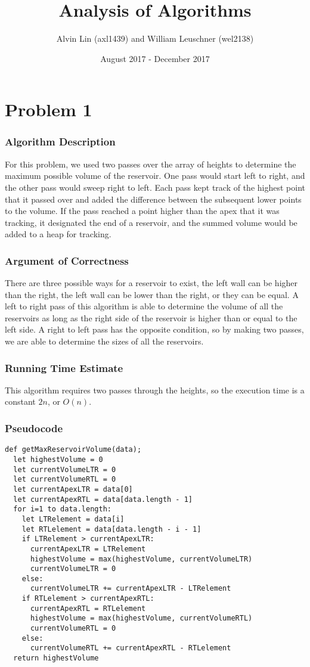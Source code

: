 \documentclass[letterpaper, 12pt]{math}
\title{Analysis of Algorithms}
\author{Alvin Lin (axl1439) and William Leuschner (wel2138)}
\date{August 2017 - December 2017}
\begin{document}
\maketitle

\section*{Problem 1}

\subsubsection*{Algorithm Description}
For this problem, we used two passes over the array of heights to determine
the maximum possible volume of the reservoir. One pass would start left to
right, and the other pass would sweep right to left. Each pass kept track of
the highest point that it passed over and added the difference between the
subsequent lower points to the volume. If the pass reached a point higher than
the apex that it was tracking, it designated the end of a reservoir, and the
summed volume would be added to a heap for tracking.

\subsubsection*{Argument of Correctness}
There are three possible ways for a reservoir to exist, the left wall can be
higher than the right, the left wall can be lower than the right, or they can
be equal. A left to right pass of this algorithm is able to determine the
volume of all the reservoirs as long as the right side of the reservoir is
higher than or equal to the left side. A right to left pass has the opposite
condition, so by making two passes, we are able to determine the sizes of all
the reservoirs.

\subsubsection*{Running Time Estimate}
This algorithm requires two passes through the heights, so the execution time is
a constant \( 2n \), or \( O(n) \).

\subsubsection*{Pseudocode}
\begin{lstlisting}
def getMaxReservoirVolume(data);
  let highestVolume = 0
  let currentVolumeLTR = 0
  let currentVolumeRTL = 0
  let currentApexLTR = data[0]
  let currentApexRTL = data[data.length - 1]
  for i=1 to data.length:
    let LTRelement = data[i]
    let RTLelement = data[data.length - i - 1]
    if LTRelement > currentApexLTR:
      currentApexLTR = LTRelement
      highestVolume = max(highestVolume, currentVolumeLTR)
      currentVolumeLTR = 0
    else:
      currentVolumeLTR += currentApexLTR - LTRelement
    if RTLelement > currentApexRTL:
      currentApexRTL = RTLelement
      highestVolume = max(highestVolume, currentVolumeRTL)
      currentVolumeRTL = 0
    else:
      currentVolumeRTL += currentApexRTL - RTLelement
  return highestVolume
\end{lstlisting}
\end{document}
